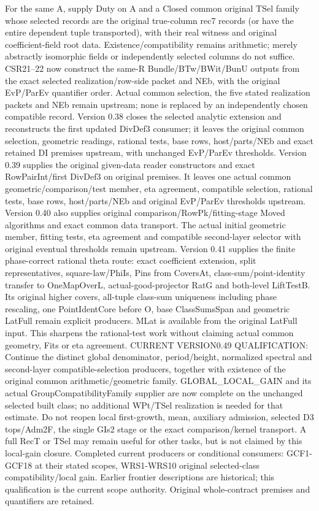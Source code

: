 For the same A, supply Duty on A and a Closed common original TSel family whose selected records are the original true-column rec7 records (or have the entire dependent tuple transported), with their real witness and original coefficient-field root data. Existence/compatibility remains arithmetic; merely abstractly isomorphic fields or independently selected columns do not suffice. CSR21–22 now construct the same-R Bundle/BTw/BWit/BunU outputs from the exact selected realization/row-side packet and NEb, with the original EvP/ParEv quantifier order. Actual common selection, the five stated realization packets and NEb remain upstream; none is replaced by an independently chosen compatible record. Version 0.38 closes the selected analytic extension and reconstructs the first updated DivDef3 consumer; it leaves the original common selection, geometric readings, rational tests, base rows, host/parts/NEb and exact retained DI premises upstream, with unchanged EvP/ParEv thresholds. Version 0.39 supplies the original given-data reader constructors and exact RowPairInt/first DivDef3 on original premises. It leaves one actual common geometric/comparison/test member, eta agreement, compatible selection, rational tests, base rows, host/parts/NEb and original EvP/ParEv thresholds upstream. Version 0.40 also supplies original comparison/RowPk/fitting-stage Moved algorithms and exact common data transport. The actual initial geometric member, fitting tests, eta agreement and compatible second-layer selector with original eventual thresholds remain upstream. Version 0.41 supplies the finite phase-correct rational theta route: exact coefficient extension, split representatives, square-law/PhiIs, Pins from CoversAt, class-sum/point-identity transfer to OneMapOverL, actual-good-projector RatG and both-level LiftTestB. Its original higher covers, all-tuple class-sum uniqueness including phase rescaling, one PointIdentCore before O, base ClassSumsSpan and geometric LatFull remain explicit producers. MLat is available from the original LatFull input. This sharpens the rational-test work without claiming actual common geometry, Fits or eta agreement. CURRENT VERSION0.49 QUALIFICATION: Continue the distinct global denominator, period/height, normalized spectral and second-layer compatible-selection producers, together with existence of the original common arithmetic/geometric family. GLOBAL\_\allowbreak LOCAL\_\allowbreak GAIN and its actual GroupCompatibilityFamily supplier are now complete on the unchanged selected built class; no additional WPt/TSel realization is needed for that estimate. Do not reopen local first-growth, mean, auxiliary admission, selected D3 tops/Adm2F, the single GIs2 stage or the exact comparison/kernel transport. A full RecT or TSel may remain useful for other tasks, but is not claimed by this local-gain closure. Completed current producers or conditional consumers: GCF1-GCF18 at their stated scopes, WRS1-WRS10 original selected-class compatibility/local gain. Earlier frontier descriptions are historical; this qualification is the current scope authority. Original whole-contract premises and quantifiers are retained.

